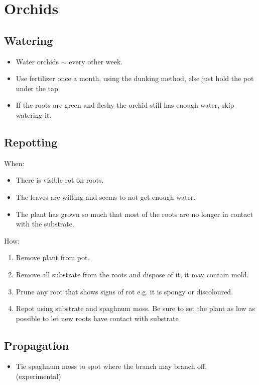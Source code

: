 \section{Orchids}

\subsection{Watering}
\begin{itemize}
\item 	Water orchids $\sim$ every other week.
\item 	Use fertilizer once a month, using the dunking method, else just hold the pot under the tap.
\item 	If the roots are green and fleshy the orchid still has enough water, skip watering it.
\end{itemize}

\subsection{Repotting}
When:
\begin{itemize}
\item	There is visible rot on roots.
\item	The leaves are wilting and seems to not get enough water.
\item	The plant has grown so much that most of the roots are no longer in contact with the substrate.
\end{itemize}
How:
\begin{enumerate}
\item 	Remove plant from pot.
\item 	Remove all substrate from the roots and dispose of it, it may contain mold.
\item 	Prune any root that shows signs of rot e.g. it is spongy or discoloured.
\item 	Repot using substrate and spaghnum moss. 
	Be sure to set the plant as low as possible to let new roots have contact with substrate
\end{enumerate}

\subsection{Propagation}
\begin{itemize}
\item	Tie spaghnum moss to spot where the branch may branch off. \\
	(experimental)
\end{itemize}
